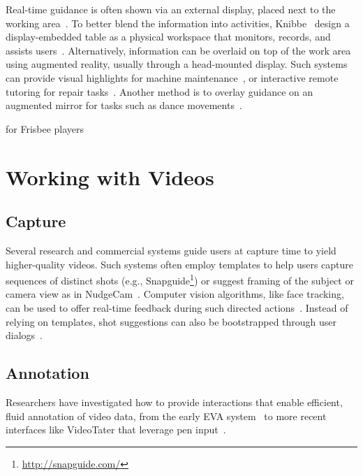 Real-time guidance is often shown via an external display, placed next to the working area~\cite{Gupta:2012ku}. To better blend the information into activities, Knibbe~\ea{} design a display-embedded table as a physical workspace that monitors, records, and assists users~\cite{Knibbe:2015:SMI:2817721.2817741}.
%
Alternatively, information can be overlaid on top of the work area using augmented reality, usually through a head-mounted display. Such systems can provide visual highlights for machine maintenance~\cite{Henderson:2011ff}, or interactive remote tutoring for repair tasks~\cite{Gurevich:2012ko}.
%
Another method is to overlay guidance on an augmented mirror for tasks such as dance movements~\cite{Anderson:2013:YEM:2501988.2502045}.

for Frisbee players~\cite{Solomon:2014:UTI:2540930.2540965}




\section{Working with Videos}


\subsection{Capture}
Several research and commercial systems guide users at capture time to yield higher-quality videos. Such systems often employ templates to help users capture sequences of distinct shots (e.g., Snapguide\footnote{\url{http://snapguide.com/}}) or suggest framing of the subject or camera view as in NudgeCam~\cite{Carter:2010}. Computer vision algorithms, like face tracking, can be used to offer real-time feedback during such directed actions~\cite{Davis:2003cu,Heer:2004ba,Carter:2010}. Instead of relying on templates, shot suggestions can also be bootstrapped through user dialogs~\cite{Adams:2005}.

\subsection{Annotation}
Researchers have investigated how to provide interactions that enable efficient, fluid annotation of video data, from the early EVA system~\cite{Mackay:1989} to more recent interfaces like VideoTater that leverage pen input~\cite{Diakopoulos:2006vt}.

